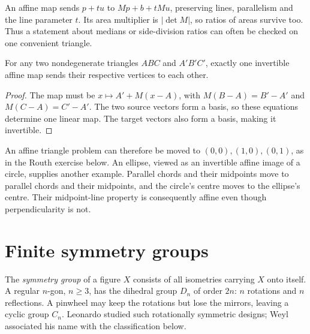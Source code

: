 An affine map sends $p+tu$ to $Mp+b+tMu$, preserving lines, parallelism and the line parameter $t$. Its area multiplier is $|\det M|$, so ratios of areas survive too. Thus a statement about medians or side-division ratios can often be checked on one convenient triangle.

\begin{proposition}\label{geometry:prop:affinetriangles}
For any two nondegenerate triangles $ABC$ and $A'B'C'$, exactly one invertible affine map sends their respective vertices to each other.
\end{proposition}
\begin{proof}
The map must be $x\mapsto A'+M(x-A)$, with $M(B-A)=B'-A'$ and $M(C-A)=C'-A'$. The two source vectors form a basis, so these equations determine one linear map. The target vectors also form a basis, making it invertible.
\end{proof}

An affine triangle problem can therefore be moved to $(0,0),(1,0),(0,1)$, as in the Routh exercise below. An ellipse, viewed as an invertible affine image of a circle, supplies another example. Parallel chords and their midpoints move to parallel chords and their midpoints, and the circle's centre moves to the ellipse's centre. Their midpoint-line property is consequently affine even though perpendicularity is not.

\section{Finite symmetry groups}

The \emph{symmetry group} of a figure $X$ consists of all isometries carrying $X$ onto itself. A regular $n$-gon, $n\ge3$, has the dihedral group $D_n$ of order $2n$: $n$ rotations and $n$ reflections. A pinwheel may keep the rotations but lose the mirrors, leaving a cyclic group $C_n$. Leonardo studied such rotationally symmetric designs; Weyl associated his name with the classification below.

